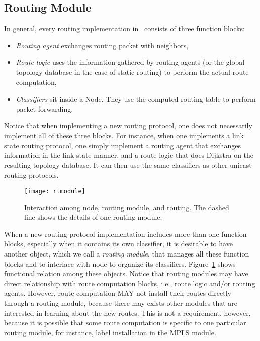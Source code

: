 \subsection{Routing Module}

In general, every routing implementation in \ns\ consists of three
function blocks: 
\begin{itemize}
\item {\em Routing agent} exchanges routing packet with neighbors, 
\item {\em Route logic} uses the information gathered by routing
  agents (or the global topology database in the case of static
  routing) to perform the actual route computation, 
\item {\em Classifiers} sit inside a Node. They use the computed
  routing table to perform packet forwarding.
\end{itemize}
Notice that when implementing a new routing protocol, one does not
necessarily implement all of these three blocks.
For instance, when one implements a link state routing protocol, one
simply implement a routing agent that exchanges information in the
link state manner, and a route logic that does Dijkstra on the
resulting topology database. 
It can then use the same classifiers as other unicast routing
protocols.

\begin{figure}[tb]
  \begin{center}
    \texttt{[image: rtmodule]}
    \caption{Interaction among node, routing module, and routing. The
      dashed line shows the details of one routing module.}
    \label{fig:node:rtmodule}
  \end{center}
\end{figure}

When a new routing protocol implementation includes more than one
function blocks, especially when it contains its own classifier, it is
desirable to have another object, which we call 
a {\em routing module}, that manages all these function 
blocks and to interface with node to organize its classifiers.
Figure~\ref{fig:node:rtmodule} shows functional relation among these
objects.
Notice that routing modules may have direct relationship with route
computation blocks, i.e., route logic and/or routing agents.
However, route computation MAY not install their routes directly
through a routing module, because there may exists other modules that
are interested in learning about the new routes.
This is not a requirement, however, because it is possible that some
route computation is specific to one particular routing module, for
instance, label installation in the MPLS module. 

